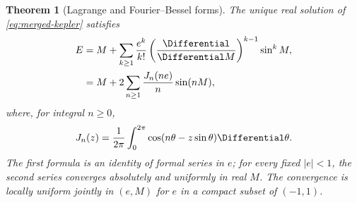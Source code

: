 \documentclass[11pt,a4paper,oneside,openany]{book}
\newtheorem{theorem}{Theorem}[chapter]
\theoremstyle{definition}
\theoremstyle{remark}
\begin{document}
\begin{theorem}[Lagrange and Fourier--Bessel forms]
\label{thm:merged-kepler}
The unique real solution of \eqref{eq:merged-kepler} satisfies
\begin{align}
 E
 &=M+\sum_{k\geq1}\frac{e^k}{k!}
   \left(\frac{\Differential}{\Differential M}\right)^{k-1}\sin^k M,                  \label{eq:merged-kepler-reversion}\\
 &=M+2\sum_{n\geq1}\frac{J_n(ne)}{n}\sin(nM),                    \label{eq:merged-kepler-bessel}
\end{align}
where, for integral $n\geq0$,
\begin{equation}
 J_n(z)=\frac1{2\pi}\int_0^{2\pi}\cos(n\theta-z\sin\theta)\Differential\theta. \label{eq:merged-bessel-integral}
\end{equation}
The first formula is an identity of formal series in $e$; for every fixed
$|e|<1$, the second series converges absolutely and uniformly in real $M$.
The convergence is locally uniform jointly in $(e,M)$ for $e$ in a compact
subset of $(-1,1)$.
\end{theorem}
\end{document}
